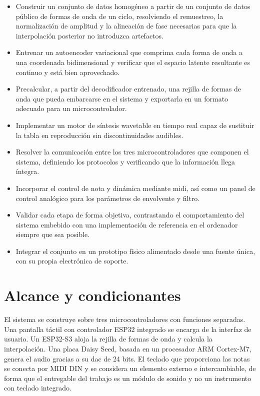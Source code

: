 \begin{itemize}
    \item Construir un conjunto de datos homogéneo a partir de un conjunto de datos público
          de formas de onda de un ciclo, resolviendo el remuestreo, la
          normalización de amplitud y la alineación de fase necesarias para que
          la interpolación posterior no introduzca artefactos.
    \item Entrenar un autoencoder variacional que comprima cada forma de onda a
          una coordenada bidimensional y verificar que el espacio latente
          resultante es continuo y está bien aprovechado.
    \item Precalcular, a partir del decodificador entrenado, una rejilla de
          formas de onda que pueda embarcarse en el sistema y exportarla en un
          formato adecuado para un microcontrolador.
    \item Implementar un motor de síntesis wavetable en tiempo real capaz de
          sustituir la tabla en reproducción sin discontinuidades audibles.
    \item Resolver la comunicación entre los tres microcontroladores que
          componen el sistema, definiendo los protocolos y verificando que la
          información llega íntegra.
    \item Incorporar el control de nota y dinámica mediante \gls{midi}, así como un
          panel de control analógico para los parámetros de envolvente y filtro.
    \item Validar cada etapa de forma objetiva, contrastando el comportamiento
          del sistema embebido con una implementación de referencia en el
          ordenador siempre que sea posible.
    \item Integrar el conjunto en un prototipo físico alimentado desde una
          fuente única, con su propia electrónica de soporte.
\end{itemize}

\section{Alcance y condicionantes}
\hypertarget{RE1.2}{}\label{RE1.2}

El sistema se construye sobre tres microcontroladores con funciones separadas.
Una pantalla táctil con controlador ESP32 integrado se encarga de la interfaz de
usuario. Un ESP32-S3 aloja la rejilla de formas de onda y calcula la
interpolación. Una placa Daisy Seed, basada en un procesador ARM Cortex-M7,
genera el audio gracias a su \gls{dac} de 24 bits. El teclado que proporciona las notas se conecta por MIDI DIN y
se considera un elemento externo e intercambiable, de forma que el entregable
del trabajo es un módulo de sonido y no un instrumento con teclado integrado.

